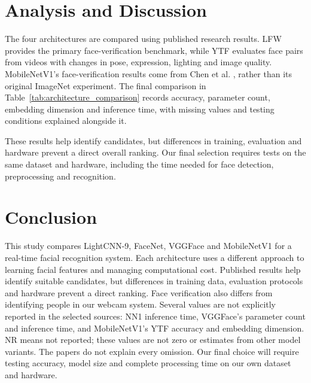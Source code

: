 \documentclass[11pt,a4paper,twocolumn]{article}
\begin{document}
\endgroup



\section{Analysis and Discussion}

The four architectures are compared using published research results. LFW provides the primary face-verification benchmark, while YTF evaluates face pairs from videos with changes in pose, expression, lighting and image quality. MobileNetV1's face-verification results come from Chen et al. \cite{chen2018mobilefacenets}, rather than its original ImageNet experiment. The final comparison in Table~\ref{tab:architecture_comparison} records accuracy, parameter count, embedding dimension and inference time, with missing values and testing conditions explained alongside it.

These results help identify candidates, but differences in training, evaluation and hardware prevent a direct overall ranking. Our final selection requires tests on the same dataset and hardware, including the time needed for face detection, preprocessing and recognition.




\section{Conclusion}

This study compares LightCNN-9, FaceNet, VGGFace and MobileNetV1 for a real-time facial recognition system. Each architecture uses a different approach to learning facial features and managing computational cost. Published results help identify suitable candidates, but differences in training data, evaluation protocols and hardware prevent a direct ranking. Face verification also differs from identifying people in our webcam system. Several values are not explicitly reported in the selected sources: NN1 inference time, VGGFace's parameter count and inference time, and MobileNetV1's YTF accuracy and embedding dimension. NR means not reported; these values are not zero or estimates from other model variants. The papers do not explain every omission. Our final choice will require testing accuracy, model size and complete processing time on our own dataset and hardware.
\end{document}
